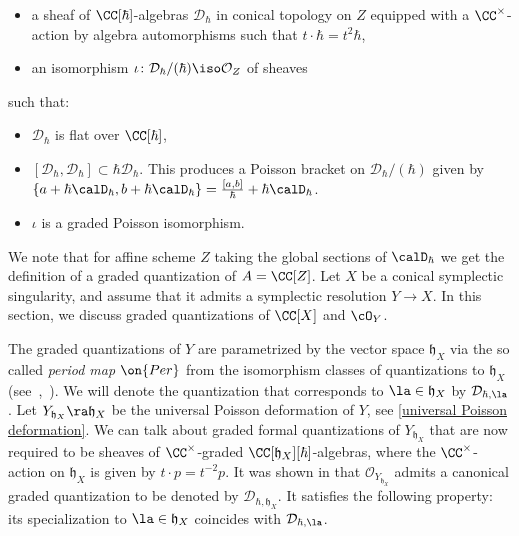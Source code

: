 \documentclass[12pt]{amsart}
\newcommand{\CO}{\mathcal{O}}
\begin{document}
 \begin{itemize}

 \item  a sheaf of $\CC[\hbar]$-algebras $\mathcal{D}_{\hbar}$ in conical topology on $Z$ equipped with a $\CC^\times$-action by algebra automorphisms such that $t \cdot \hbar = t^2 \hbar$,


 \item an isomorphism $\iota \colon \mathcal{D}_\hbar/(\hbar) \iso \CO_Z$ of sheaves

 \end{itemize} 
 such that:
	
	
	\begin{itemize}
		
		\item  $\mathcal{D}_\hbar$ is flat over $\CC[\hbar]$,
		
        \item $[\mathcal{D}_\hbar,\mathcal{D}_\hbar] \subset \hbar \mathcal{D}_\hbar$. This produces a Poisson bracket on $\mathcal{D}_\hbar/(\hbar)$ given by $\{a+\hbar\calD_\hbar, b+\hbar\calD_\hbar \}=\frac{[a,b]}{\hbar}+\hbar\calD_\hbar$.

        \item $\iota$ is a graded Poisson isomorphism.
		
	\end{itemize}
    We note that for affine scheme $Z$ taking the global sections of $\calD_\hbar$ we get the definition of a graded quantization of $A=\CC[Z]$. Let $X$ be a conical symplectic singularity, and assume that it admits a symplectic resolution $Y\to X$. In this section, we discuss graded quantizations of $\CC[X]$ and $\cO_{Y}$.
    
   The graded quantizations of $Y$ are parametrized by the vector space $\mathfrak{h}_X$ via the so called {\em{period map}} $\on{Per}$ from the isomorphism classes of quantizations to $\mathfrak{h}_X$ (see~\cite{BK},~\cite[Section~2.3]{Losev_isofquant}). We will denote the quantization that corresponds to $\la \in \mathfrak{h}_X$ by $\mathcal{D}_{\hbar, \la}$.
   Let $Y_{\mathfrak{h}_X} \ra \mathfrak{h}_X$ be the universal Poisson deformation of $Y$, see \cref{universal Poisson deformation}. We can talk about graded formal quantizations of $Y_{\mathfrak{h}_X}$ that are now required to be sheaves of $\CC^\times$-graded $\CC[\mathfrak{h}_X][\hbar]$-algebras, where the $\CC^\times$-action on $\mathfrak{h}_X$ is given by $t \cdot p = t^{-2}p$. It was shown in \cite[Section 6.2]{BK} that $\CO_{Y_{\mathfrak{h}_X}}$ admits a canonical graded quantization to be denoted by $\mathcal{D}_{\hbar, \mathfrak{h}_X}$. It satisfies the following property: its specialization to $\la \in \mathfrak{h}_X$ coincides with $\mathcal{D}_{\hbar, \la}$.
\end{document}
